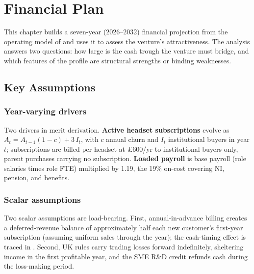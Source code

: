 \chapter{Financial Plan}
\label{chapter:ent-financial}

This chapter builds a seven-year (2026--2032) financial projection from the operating model of  and uses it to assess the venture's attractiveness. The analysis answers two questions: how large is the cash trough the venture must bridge, and which features of the profile are structural strengths or binding weaknesses.

\section{Key Assumptions}
\label{sec:ent-assumptions}

\subsection{Year-varying drivers}
\label{sec:ent-fin-operational-drivers}



Two drivers in  merit derivation. \textbf{Active headset subscriptions} evolve as $A_t = A_{t-1}(1-c) + 3\,I_t$, with $c$ annual churn and $I_t$ institutional buyers in year $t$; subscriptions are billed per headset at \pounds600/yr to institutional buyers only, parent purchases carrying no subscription. \textbf{Loaded payroll} is base payroll (role salaries times role FTE) multiplied by 1.19, the 19\% on-cost covering NI, pension, and benefits.

\subsection{Scalar assumptions}
\label{sec:ent-fin-conventions}



Two scalar assumptions are load-bearing. First, annual-in-advance billing creates a deferred-revenue balance of approximately half each new customer's first-year subscription (assuming uniform sales through the year); the cash-timing effect is traced in . Second, UK rules carry trading losses forward indefinitely, sheltering income in the first profitable year, and the SME R\&D credit refunds cash during the loss-making period.


